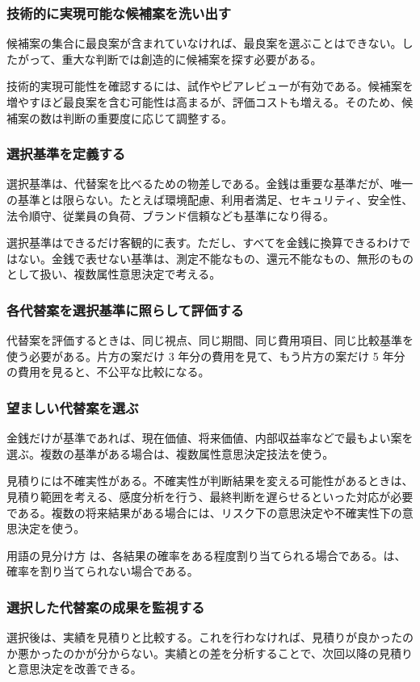 \subsubsection{技術的に実現可能な候補案を洗い出す}

候補案の集合に最良案が含まれていなければ、最良案を選ぶことはできない。したがって、重大な判断では創造的に候補案を探す必要がある。

技術的実現可能性を確認するには、試作やピアレビューが有効である。候補案を増やすほど最良案を含む可能性は高まるが、評価コストも増える。そのため、候補案の数は判断の重要度に応じて調整する。

\subsubsection{選択基準を定義する}

選択基準は、代替案を比べるための物差しである。金銭は重要な基準だが、唯一の基準とは限らない。たとえば環境配慮、利用者満足、セキュリティ、安全性、法令順守、従業員の負荷、ブランド信頼なども基準になり得る。

選択基準はできるだけ客観的に表す。ただし、すべてを金銭に換算できるわけではない。金銭で表せない基準は、測定不能なもの、還元不能なもの、無形のものとして扱い、複数属性意思決定で考える。

\subsubsection{各代替案を選択基準に照らして評価する}

代替案を評価するときは、同じ視点、同じ期間、同じ費用項目、同じ比較基準を使う必要がある。片方の案だけ 3 年分の費用を見て、もう片方の案だけ 5 年分の費用を見ると、不公平な比較になる。

\subsubsection{望ましい代替案を選ぶ}

金銭だけが基準であれば、現在価値、将来価値、内部収益率などで最もよい案を選ぶ。複数の基準がある場合は、複数属性意思決定技法を使う。

見積りには不確実性がある。不確実性が判断結果を変える可能性があるときは、見積り範囲を考える、感度分析を行う、最終判断を遅らせるといった対応が必要である。複数の将来結果がある場合には、リスク下の意思決定や不確実性下の意思決定を使う。

\begin{notebox}{用語の見分け方}
は、各結果の確率をある程度割り当てられる場合である。は、確率を割り当てられない場合である。
\end{notebox}

\subsubsection{選択した代替案の成果を監視する}

選択後は、実績を見積りと比較する。これを行わなければ、見積りが良かったのか悪かったのかが分からない。実績との差を分析することで、次回以降の見積りと意思決定を改善できる。
